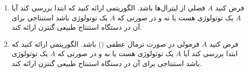\begin{enumerate}
  \item
  فرض کنید $A$ فصلی از لیترال‌ها باشد. الگوریتمی ارائه کنید که ابتدا بررسی کند آیا $A$ یک توتولوژی هست یا نه و در صورتی که $A$ یک توتولوژی باشد استنتاجی برای آن در دستگاه استنتاج طبیعی گنتزن ارائه کند.
  \item
  فرض کنید $A$ فرمولی در صورت نرمال عطفی () باشد. الگوریتمی ارائه کنید که ابتدا بررسی کند آیا $A$ یک توتولوژی هست یا نه و در صورتی که $A$ یک توتولوژی باشد استنتاجی برای آن در دستگاه استنتاج طبیعی گنتزن ارائه کند.
\end{enumerate}